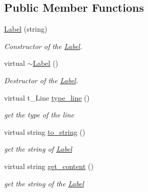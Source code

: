 \subsection*{Public Member Functions}
\begin{DoxyCompactItemize}
\item 
\mbox{\label{class_label_a48e774efc0e6e5cd0bf63a94527add17}} 
\mbox{\hyperlink{class_label_a48e774efc0e6e5cd0bf63a94527add17}{Label}} (string)
\begin{DoxyCompactList}\small\item\em Constructor of the \mbox{\hyperlink{class_label}{Label}}. \end{DoxyCompactList}\item 
\mbox{\label{class_label_ae0405d591a2ff63c03b104435e2a3066}} 
virtual \mbox{\hyperlink{class_label_ae0405d591a2ff63c03b104435e2a3066}{$\sim$\+Label}} ()
\begin{DoxyCompactList}\small\item\em Destructor of the \mbox{\hyperlink{class_label}{Label}}. \end{DoxyCompactList}\item 
\mbox{\label{class_label_afc727d8ae97b32660faf703b30edc77e}} 
virtual t\+\_\+\+Line \mbox{\hyperlink{class_label_afc727d8ae97b32660faf703b30edc77e}{type\+\_\+line}} ()
\begin{DoxyCompactList}\small\item\em get the type of the line \end{DoxyCompactList}\item 
\mbox{\label{class_label_a6df2e96366cc459a6a8fa9642a6e69b6}} 
virtual string \mbox{\hyperlink{class_label_a6df2e96366cc459a6a8fa9642a6e69b6}{to\+\_\+string}} ()
\begin{DoxyCompactList}\small\item\em get the string of \mbox{\hyperlink{class_label}{Label}} \end{DoxyCompactList}\item 
\mbox{\label{class_label_a8d48d53b6eb2c6024b7da507bfa5d00b}} 
virtual string \mbox{\hyperlink{class_label_a8d48d53b6eb2c6024b7da507bfa5d00b}{get\+\_\+content}} ()
\begin{DoxyCompactList}\small\item\em get the string of the \mbox{\hyperlink{class_label}{Label}} \end{DoxyCompactList}\item 

\end{DoxyCompactItemize}
